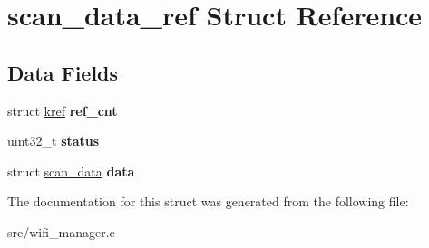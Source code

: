 \hypertarget{structscan__data__ref}{}\section{scan\+\_\+data\+\_\+ref Struct Reference}
\label{structscan__data__ref}
\subsection*{Data Fields}
\begin{DoxyCompactItemize}
\item 
\mbox{\label{structscan__data__ref_ad1a82b8272bdd585a5f575d4b2040842}} 
struct \mbox{\hyperlink{structkref}{kref}} {\bfseries ref\+\_\+cnt}
\item 
\mbox{\label{structscan__data__ref_aa455fd99f6876ebad0f7cb556638c084}} 
uint32\+\_\+t {\bfseries status}
\item 
\mbox{\label{structscan__data__ref_a5cec1b29040a8ed3f18bd7913b8ba1b0}} 
struct \mbox{\hyperlink{structscan__data}{scan\+\_\+data}} {\bfseries data}
\end{DoxyCompactItemize}


The documentation for this struct was generated from the following file\+:\begin{DoxyCompactItemize}
\item 
src/wifi\+\_\+manager.\+c\end{DoxyCompactItemize}
